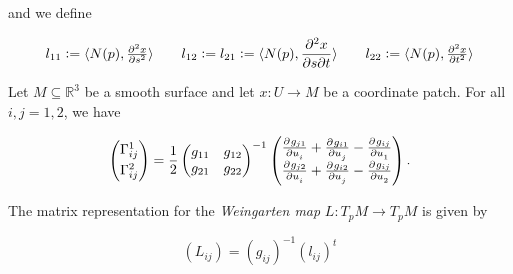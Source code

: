 and we define

\begin{equation}
	l_{11} := \langle N(p), \pd[2]{x}{s} \rangle \qquad l_{12} := l_{21} := \langle N(p), \frac{\partial^2 x}{\partial s\partial t}\rangle \qquad 	l_{22} := \langle N(p), \pd[2]{x}{t} \rangle 
\end{equation}

\vspace{1mm}

\begin{lemma}
	Let $M \subseteq \mathbb{R}^3$ be a smooth surface and let $x: U \to M$ be a coordinate patch. For all $i,j = 1,2$, we have 

	\begin{equation}
		\begin{pmatrix}
			\Gamma^1_{ij}\\[3pt]
			\Gamma^2_{ij}
		\end{pmatrix}
		= \frac{1}{2}\begin{pmatrix}
			g_{11} & g_{12}\\
			g_{21} & g_{22}
		\end{pmatrix}^{-1}
		\begin{pmatrix}
			\pd{g_{j1}}{u_i} + \pd{g_{i1}}{u_j} - \pd{g_{ij}}{u_1}\\
			\pd{g_{j2}}{u_i} + \pd{g_{i2}}{u_j} - \pd{g_{ij}}{u_2}
		\end{pmatrix}.
	\end{equation}
\end{lemma}

\vspace{1mm}

The matrix representation for the \emph{Weingarten map} $L: T_pM \to T_pM$ is given by 

\begin{equation}
	(L_{ij}) = (g_{ij})^{-1}(l_{ij})^t
\end{equation}

